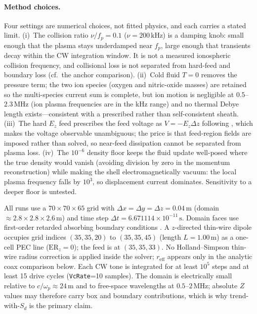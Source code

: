 \documentclass[draft]{agujournal2025}
\begin{document}
\paragraph{Method choices.} Four settings are numerical choices, not fitted physics, and each carries a stated limit. (i)~The collision ratio \(\nu/f_p=0.1\) (\(\nu=200\,\mathrm{kHz}\)) is a damping knob: small enough that the plasma stays underdamped near \(f_p\), large enough that transients decay within the CW integration window. It is not a measured ionospheric collision frequency, and collisional loss is not separated from hard-feed and boundary loss (cf.~the anchor comparison). (ii)~Cold fluid \(T=0\) removes the pressure term; the two ion species (oxygen and nitric-oxide masses) are retained so the multi-species current sum is complete, but ion motion is negligible at \(0.5\)--\(2.3\,\mathrm{MHz}\) (ion plasma frequencies are in the kHz range) and no thermal Debye length exists---consistent with a prescribed rather than self-consistent sheath. (iii)~The hard \(E_z\) feed prescribes the feed voltage as \(V=-E_z\Delta z\) following \cite{ward2006}, which makes the voltage observable unambiguous; the price is that feed-region fields are imposed rather than solved, so near-feed dissipation cannot be separated from plasma loss. (iv)~The \(10^{-6}\) density floor keeps the fluid update well-posed where the true density would vanish (avoiding division by zero in the momentum reconstruction) while making the shell electromagnetically vacuum: the local plasma frequency falls by \(10^3\), so displacement current dominates. Sensitivity to a deeper floor is untested.

All runs use a \(70\times 70\times 65\) grid with \(\Delta x=\Delta y=\Delta z=0.04\,\mathrm{m}\) (domain \(\approx 2.8\times 2.8\times 2.6\,\mathrm{m}\)) and time step \(\Delta t=6.671114\times 10^{-11}\,\mathrm{s}\). Domain faces use first-order retarded absorbing boundary conditions \cite{ward2006}. A \(z\)-directed thin-wire dipole occupies grid indices \((35,35,20)\) to \((35,35,45)\) (length \(L=1.00\,\mathrm{m}\)) as a one-cell PEC line (\(\mathrm{ER}_z=0\)); the feed is at \((35,35,33)\). No Holland--Simpson thin-wire radius correction is applied inside the solver; \(r_\mathrm{eff}\) appears only in the analytic coax comparison below. Each CW tone is integrated for at least \(10^5\) steps and at least 15 drive cycles (\texttt{VcRate}=10 samples). The domain is electrically small relative to \(c/\omega_p\approx 24\,\mathrm{m}\) and to free-space wavelengths at \(0.5\)--\(2\,\mathrm{MHz}\); absolute \(Z\) values may therefore carry box and boundary contributions, which is why trend-with-\(S_d\) is the primary claim.
\end{document}
